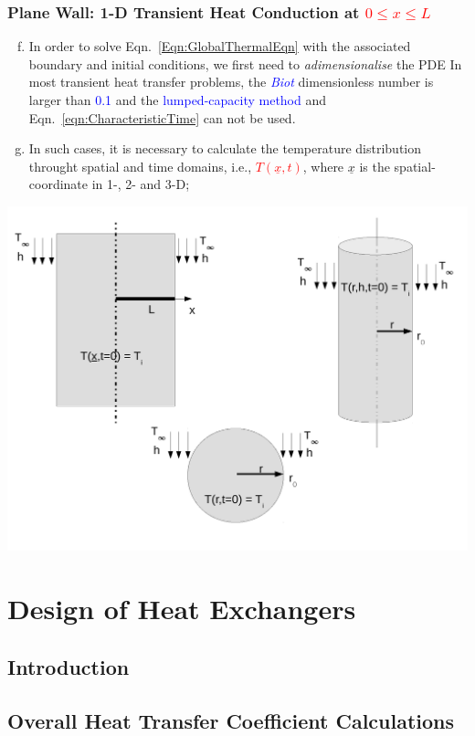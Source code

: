 \documentclass[10pt,compress]{beamer}
\newcommand{\red}{\textcolor{red}}
\newcommand{\blue}{\textcolor{blue}}
\begin{document}
\begin{frame}
 \frametitle{Plane Wall: 1-D Transient Heat Conduction at \red{$0\leq x\leq L$} }
   \begin{enumerate}[(a)]\setcounter{enumi}{5}%
     \item<1-> In order to solve Eqn.~\ref{Eqn:GlobalThermalEqn} with the associated boundary and initial conditions, we first need to {\it adimensionalise} the PDE 
In most transient heat transfer problems, the \blue{\it Biot} dimensionless number is larger than \blue{0.1} and the \blue{lumped-capacity method} and Eqn.~\ref{eqn:CharacteristicTime} can not be used.
     \item<2-> In such cases, it is necessary to calculate the temperature distribution throught spatial and time domains, i.e., \red{$T\left(\underline{x},t\right)$}, where $\underline{x}$ is the spatial-coordinate in 1-, 2- and 3-D;
   \end{enumerate}

   \begin{center}
      \includegraphics[width=0.55\columnwidth,height=0.45\columnwidth,clip]{./Pics/HT_All}
   \end{center}
\end{frame}





\section{Design of Heat Exchangers}

\subsection{Introduction}

\subsection{Overall Heat Transfer Coefficient Calculations}
\end{document}
